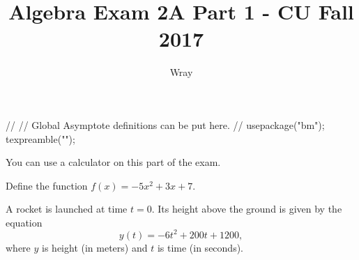 \documentclass[addpoints, 12pt]{exam}
\title{Algebra Exam 2A Part 1 - CU Fall 2017}
\author{Wray}
\begin{document}
\begin{asydef}
//
// Global Asymptote definitions can be put here.
//
usepackage("bm");
texpreamble("\def\V#1{\bm{#1}}");
\end{asydef}

\bigskip

             
\bigskip
You can use a calculator on this part of the exam.

\begin{questions}

\question[16]
Define the function $f(x) = -5x^2 + 3x + 7$.

\clearpage 

\question[24]
A rocket is launched at time $t=0$.  Its height above the ground is given by the equation \begin{equation*}
	y(t) = -6t^2 + 200t + 1200,
\end{equation*}
where $y$ is height (in meters) and $t$ is time (in seconds).
\end{questions}
\end{document}
